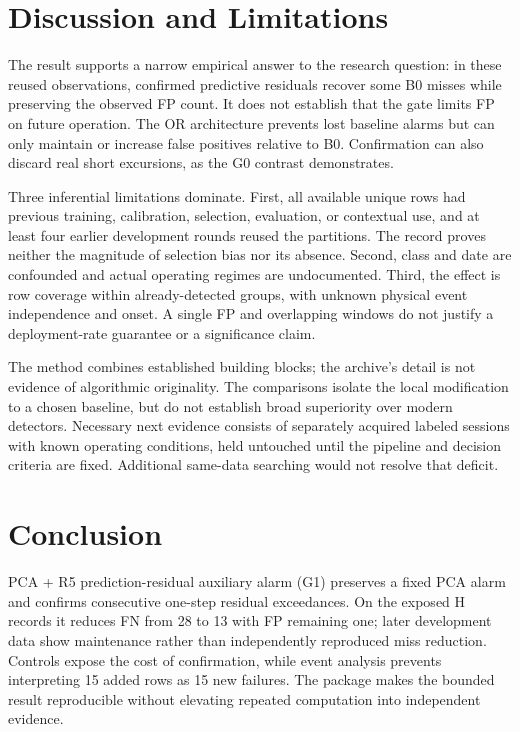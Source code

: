 \documentclass{article}
\begin{document}
\section{Discussion and Limitations}
The result supports a narrow empirical answer to the research question: in these reused observations, confirmed predictive residuals recover some B0 misses while preserving the observed FP count. It does not establish that the gate limits FP on future operation. The OR architecture prevents lost baseline alarms but can only maintain or increase false positives relative to B0. Confirmation can also discard real short excursions, as the G0 contrast demonstrates.

Three inferential limitations dominate. First, all available unique rows had previous training, calibration, selection, evaluation, or contextual use, and at least four earlier development rounds reused the partitions. The record proves neither the magnitude of selection bias nor its absence. Second, class and date are confounded and actual operating regimes are undocumented. Third, the effect is row coverage within already-detected groups, with unknown physical event independence and onset. A single FP and overlapping windows do not justify a deployment-rate guarantee or a significance claim.

The method combines established building blocks; the archive's detail is not evidence of algorithmic originality. The comparisons isolate the local modification to a chosen baseline, but do not establish broad superiority over modern detectors. Necessary next evidence consists of separately acquired labeled sessions with known operating conditions, held untouched until the pipeline and decision criteria are fixed. Additional same-data searching would not resolve that deficit.

\section{Conclusion}
PCA + R5 prediction-residual auxiliary alarm (G1) preserves a fixed PCA alarm and confirms consecutive one-step residual exceedances. On the exposed H records it reduces FN from 28 to 13 with FP remaining one; later development data show maintenance rather than independently reproduced miss reduction. Controls expose the cost of confirmation, while event analysis prevents interpreting 15 added rows as 15 new failures. The package makes the bounded result reproducible without elevating repeated computation into independent evidence.
\label{mainend}
\clearpage
\end{document}
